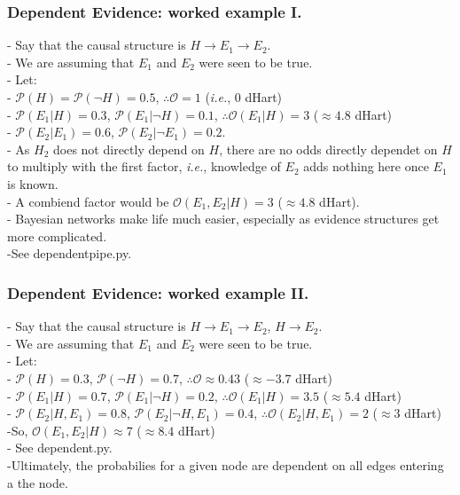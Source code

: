 \documentclass[•]{beamer}
\begin{document}
		\begin{frame}
		\frametitle{Dependent Evidence: worked example I.}
		- Say that the causal structure is $H \rightarrow E_{1} \rightarrow E_{2}$.\\
		- We are assuming that $E_{1}$ and $E_{2}$ were seen to be true.\\
		- Let:\\
			- $\mathcal{P}(H) = \mathcal{P}(\neg H) = 0.5$, $\therefore \mathcal{O} = 1$ (\textit{i.e.}, 0 dHart)\\
			- $\mathcal{P}(E_{1} | H) = 0.3$, $\mathcal{P}(E_{1} | \neg H) = 0.1$, $\therefore \mathcal{O}(E_{1} | H) = 3$ ($\approx 4.8$ dHart)\\
			- $\mathcal{P}(E_{2} | E_{1}) = 0.6$, $\mathcal{P}(E_{2} | \neg E_{1}) = 0.2$.\\
			- As $H_{2}$ does not directly depend on $H$, there are no odds directly dependet on $H$ to multiply with the first factor, \textit{i.e.}, knowledge of $E_{2}$ adds nothing here once $E_{1}$ is known.\\
			- A combiend factor would be $\mathcal{O}(E_{1}, E_{2} | H) = 3$ ($\approx 4.8$ dHart).\\ 
			- Bayesian networks make life much easier, especially as evidence structures get more complicated.\\
			-See dependent\textunderscore pipe.py.\\
	\end{frame}
	\begin{frame}
		\frametitle{Dependent Evidence: worked example II.}
		- Say that the causal structure is $H \rightarrow E_{1} \rightarrow E_{2}$, $H \rightarrow E_{2}$.\\
		- We are assuming that $E_{1}$ and $E_{2}$ were seen to be true.\\
		- Let:\\
			- $\mathcal{P}(H) = 0.3$, $\mathcal{P}(\neg H) = 0.7$, $\therefore \mathcal{O} \approx 0.43$ ($\approx -3.7$ dHart)\\
			- $\mathcal{P}(E_{1} | H) = 0.7$, $\mathcal{P}(E_{1} | \neg H) = 0.2$, $\therefore \mathcal{O}(E_{1} | H) = 3.5$ ($\approx 5.4$ dHart)\\
			- $\mathcal{P}(E_{2} | H, E_{1}) = 0.8$, $\mathcal{P}(E_{2} | \neg H, E_{1}) = 0.4$, $\therefore \mathcal{O}(E_{2} | H, E_{1}) = 2$ ($\approx 3$ dHart)\\
			-So, $\mathcal{O}(E_{1}, E_{2} | H) \approx 7$ ($\approx 8.4$ dHart)\\
			- See dependent.py.\\
			-Ultimately, the probabilies for a given node are dependent on all edges entering a the node.\\
	\end{frame}
\end{document}
